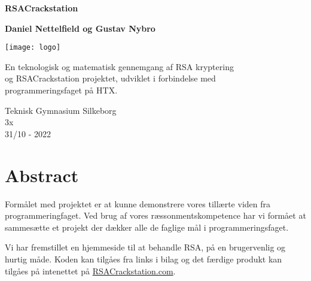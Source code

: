 \documentclass[a4paper,12pt]{extarticle}
\begin{document}
    \begin{titlepage}
        \begin{center}
            \vspace{1cm}

            \begin{huge}
                \textbf{RSACrackstation}
            \end{huge}


            \vspace{1cm}

            \textbf{Daniel Nettelfield og Gustav Nybro}

            \vspace{1.5cm}

            \noindent
            \texttt{[image: logo]}



            \vfill

            En teknologisk og matematisk gennemgang af RSA kryptering\\
            og RSACrackstation projektet, udviklet i forbindelse med\\
            programmeringsfaget på HTX.\@

            \vspace{0.8cm}

            Teknisk Gymnasium Silkeborg\\
            3x\\
            31/10 - 2022

        \end{center}
    \end{titlepage}

    \newpage

    \section*{Abstract}\label{sec:abstract}

    Formålet med projektet er at kunne demonstrere vores tillærte viden fra programmeringfaget.
    Ved brug af vores ræssonmentskompetence har vi formået at sammesætte et projekt der dækker alle de faglige mål i programmeringsfaget.

    Vi har fremstillet en hjemmeside til at behandle RSA, på en brugervenlig og hurtig måde. Koden kan tilgåes fra links i bilag og det færdige produkt kan tilgåes på intenettet på \href{https://rsacrackstation.com}{RSACrackstation.com}.

    \newpage
\end{document}

